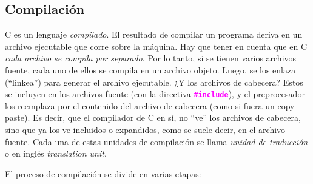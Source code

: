 \documentclass[]{scrartcl}
\newcommand{\hl}[1]{\textcolor{magenta}{\textbf{\texttt{#1}}}}
\begin{document}
\subsection*{Compilación}

C es un lenguaje \textit{compilado}. El resultado de compilar un programa deriva en un archivo ejecutable que corre sobre la máquina. Hay que tener en cuenta que en C \textit{cada archivo se compila por separado}. Por lo tanto, si se tienen varios archivos fuente, cada uno de ellos se compila en un archivo objeto. Luego, se los enlaza (``linkea'') para generar el archivo ejecutable. ¿Y los archivos de cabecera? Estos se incluyen en los archivos fuente (con la directiva \hl{\#include}), y el preprocesador los reemplaza por el contenido del archivo de cabecera (como si fuera un copy-paste). Es decir, que el compilador de C en sí, no ``ve'' los archivos de cabecera, sino que ya los ve incluidos o expandidos, como se suele decir, en el archivo fuente. Cada una de estas unidades de compilación se llama \textit{unidad de traducción} o en inglés \textit{translation unit}.

El proceso de compilación se divide en varias etapas:
\end{document}
